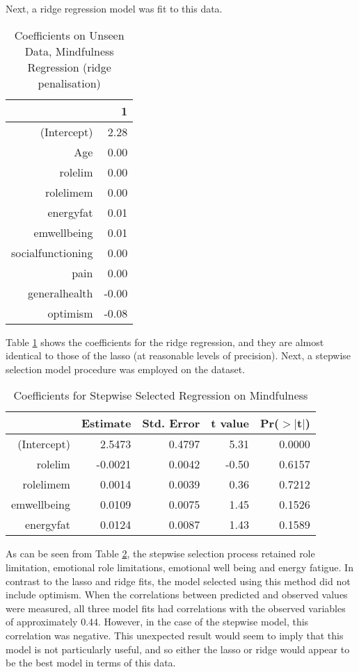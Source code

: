 \documentclass{article}
\begin{document}
Next, a ridge regression model was fit to this data. 

\begin{table}[ht]
\centering
\begin{tabular}{rr}
  \hline
 & 1 \\ 
  \hline
(Intercept) & 2.28 \\ 
  Age & 0.00 \\ 
  rolelim & 0.00 \\ 
  rolelimem & 0.00 \\ 
  energyfat & 0.01 \\ 
  emwellbeing & 0.01 \\ 
  socialfunctioning & 0.00 \\ 
  pain & 0.00 \\ 
  generalhealth & -0.00 \\ 
  optimism & -0.08 \\ 
   \hline
\end{tabular}
\caption{Coefficients on Unseen Data, Mindfulness Regression (ridge penalisation)} 
\label{tab:hom1mindridge}
\end{table}
Table \ref{tab:hom1mindridge} shows the coefficients for the ridge regression, and they are almost identical to those of the lasso (at reasonable levels of precision). Next, a stepwise selection model procedure was employed on the dataset. 


\begin{table}[ht]
\centering
\begin{tabular}{rrrrr}
  \hline
 & Estimate & Std. Error & t value & Pr($>$$|$t$|$) \\ 
  \hline
(Intercept) & 2.5473 & 0.4797 & 5.31 & 0.0000 \\ 
  rolelim & -0.0021 & 0.0042 & -0.50 & 0.6157 \\ 
  rolelimem & 0.0014 & 0.0039 & 0.36 & 0.7212 \\ 
  emwellbeing & 0.0109 & 0.0075 & 1.45 & 0.1526 \\ 
  energyfat & 0.0124 & 0.0087 & 1.43 & 0.1589 \\ 
   \hline
\end{tabular}
\caption{Coefficients for Stepwise Selected Regression on Mindfulness} 
\label{tab:hom1mindsteptest}
\end{table}
As can be seen from Table \ref{tab:hom1mindsteptest}, the stepwise selection process retained role limitation, emotional role limitations, emotional well being and energy fatigue. In contrast to the lasso and ridge fits, the model selected using this method did not include optimism. When the correlations between predicted and observed values were measured, all three model fits had correlations with the observed variables of approximately 0.44. However, in the case of the stepwise model, this correlation was negative. This unexpected result would seem to imply that this model is not particularly useful, and so either the lasso or ridge would appear to be the best model in terms of this data. 
\end{document}
